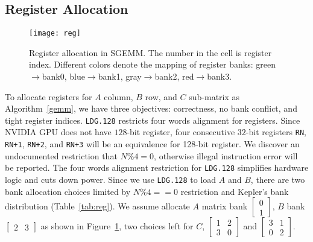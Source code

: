 \subsection{Register Allocation}
\label{sec:register}
\begin{figure}[htbp]
\begin{center}
\texttt{[image: reg]}
\caption{Register allocation in SGEMM. The number in the cell is register index.
Different colors denote the mapping of register banks: green$\rightarrow$bank0,
    blue$\rightarrow$bank1, gray$\rightarrow$bank2, red$\rightarrow$bank3.}
\label{fig:reg}
\end{center}
\end{figure}

To allocate registers for $A$ column, $B$ row, and $C$ sub-matrix as Algorithm~\ref{gemm}, we have three objectives:
correctness, no bank conflict, and tight register indices.
{\tt LDG.128} restricts four words alignment for registers.
Since NVIDIA GPU does not have $128$-bit register, 
four consecutive $32$-bit registers {\tt RN}, {\tt RN+1}, {\tt RN+2}, and {\tt RN+3} will be an equivalence for 128-bit
register.
We discover an undocumented restriction that $N\%4=0$, otherwise illegal instruction error will be reported.
The four words alignment restriction for {\tt LDG.128} simplifies hardware logic and cuts down power.
Since we use {\tt LDG.128} to load $A$ and $B$, there are two bank allocation choices limited by $N\%4==0$ restriction and Kepler's bank distribution (Table~\ref{tab:reg}).
We assume allocate $A$ matrix bank $\begin{bmatrix} 0 \\ 1  \end{bmatrix}$,
    $B$ bank $\begin{bmatrix} 2 & 3 \end{bmatrix}$ as shown in Figure~\ref{fig:reg}, two choices left for $C$,
$\begin{bmatrix} 1 & 2 \\ 3 & 0  \end{bmatrix}$ and
$\begin{bmatrix} 3 & 1 \\ 0 & 2  \end{bmatrix}$.
